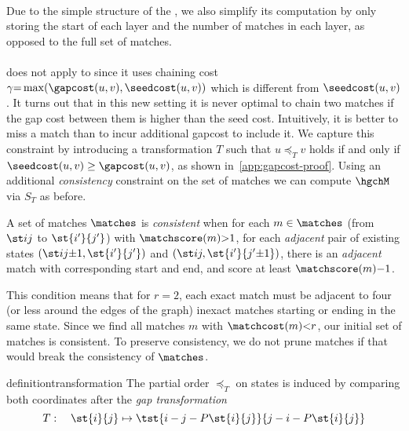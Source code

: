 \paragraph{\SH} Due to the simple structure of the \sh, we also simplify its
computation by only storing the start of each layer and the number of matches in
each layer, as opposed to the full set of matches.

\paragraph{\GCH}
 does not apply to \gch since it uses chaining cost
$\gamma{=}\max(\gapcost(u, v), \seedcost(u,v))$ which is different from
$\seedcost(u,v)$. It turns out that in this new setting it is never optimal to chain
two matches if the gap cost between them is higher than the seed cost.
Intuitively, it is better to miss a match than to incur additional gapcost to
include it. We capture this constraint by introducing a transformation $T$ such
that $u\preceq_T v$ holds if and only if $\seedcost(u,v) \geq \gapcost(u,v)$, as
shown in~\cref{app:gapcost-proof}. Using an additional \emph{consistency}
constraint on the set of matches we can compute $\hgchM$ via $S_T$ as before.

\begin{definition}\label{dfn:consistent} %
  A set of matches $\matches$ is \emph{consistent} when for each $m\in\matches$
  (from $\st ij$ to $\st {i'}{j'}$) with $\matchscore(m) {>} 1$, for each
  \emph{adjacent} pair of existing states $(\st i{j{\pm}1}, \st{i'}{j'})$ and
  $(\st ij, \st {i'}{j'{\pm}1})$, there is an \emph{adjacent} match with corresponding start and
  end, and score at least $\matchscore(m){-}1$.
\end{definition}
This condition means that for $r{=}2$, each exact match must be adjacent to four
(or less around the edges of the graph) inexact matches starting or ending in
the same state. Since we find all matches $m$ with $\matchcost(m){<}r$, our initial set
of matches is consistent. To preserve consistency, we do not prune matches if
that would break the consistency of $\matches$.

\begin{restatable}{definition}{transformation}\label{dfn:transformation} %
  The partial order $\preceq_T$ on states is induced by comparing both
  coordinates after the \emph{gap transformation}
\begin{equation*}
  T: \quad\st{i}{j}\mapsto \tst{i - j - P\st{i}{j}}{j-i-P\st{i}{j}}
\end{equation*}
\end{restatable}

